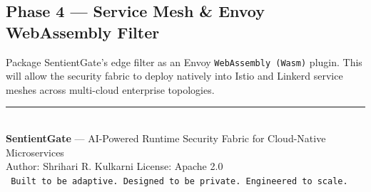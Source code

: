 \documentclass[12pt, a4paper]{article}
\newcommand{\tech}[1]{\texttt{\color{accentblue}#1}}
\begin{document}
\subsection{Phase 4 — Service Mesh \& Envoy WebAssembly Filter}
Package SentientGate's edge filter as an Envoy \tech{WebAssembly (Wasm)} plugin. This will allow the security fabric to deploy natively into Istio and Linkerd service meshes across multi-cloud enterprise topologies.

\vfill

\begin{center}
\textcolor{bordercolor}{\rule{0.8\linewidth}{0.5pt}}\\[6pt]
\small\color{midgray}
\textbf{SentientGate} — AI-Powered Runtime Security Fabric for Cloud-Native Microservices\\
Author: Shrihari R. Kulkarni \textbullet\; License: Apache 2.0 \textbullet{}\\[4pt]
\texttt{\small\color{accentteal} Built to be adaptive. Designed to be private. Engineered to scale.}
\end{center}
\end{document}
